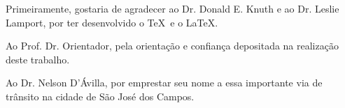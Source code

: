 Primeiramente, gostaria de agradecer ao Dr. Donald E. Knuth e ao Dr. Leslie Lamport, por ter desenvolvido o \TeX\ e o \LaTeX.

Ao Prof. Dr. Orientador, pela orientação e confiança depositada na realização deste trabalho.

Ao Dr. Nelson D'Ávilla, por emprestar seu nome a essa importante via de trânsito na cidade de São José dos Campos.
